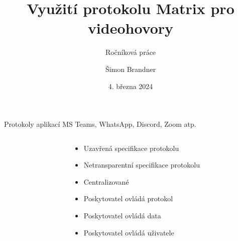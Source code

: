 \documentclass[aspectratio=169]{beamer}
\title{Využití protokolu Matrix pro videohovory}
\subtitle{Ročníková práce}
\author{Šimon Brandner}
\date{4. března 2024}
\begin{document}
\maketitle
\begin{frame}{Protokoly aplikací MS Teams, WhatsApp, Discord, Zoom atp.}
    \pause
    \begin{columns}
        \begin{column}{0.5\textwidth}
            \centering
        \end{column}
        \begin{column}{0.5\textwidth}
            \begin{itemize}[<+->]
                \item Uzavřená specifikace protokolu
                \item Netransparentní specifikace protokolu
                \item Centralizované
                \item Poskytovatel ovládá protokol
                \item Poskytovatel ovládá data
                \item Poskytovatel ovládá uživatele
            \end{itemize}
        \end{column}
    \end{columns}
\end{frame}
\end{document}
